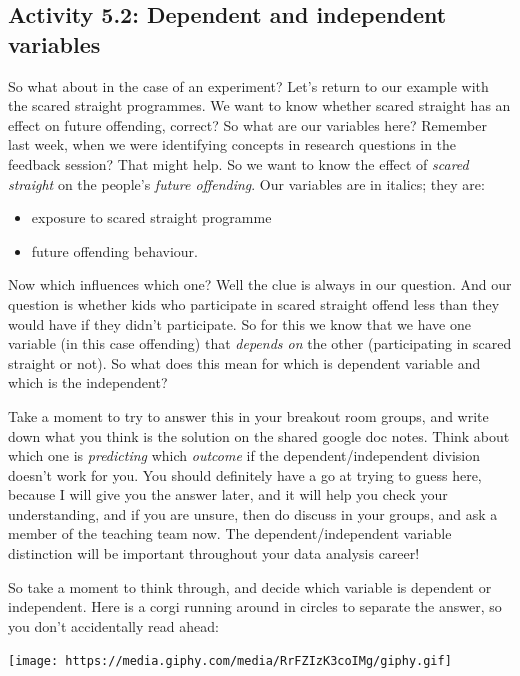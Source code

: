\documentclass[
]{book}
\providecommand{\tightlist}{%
  \setlength{\itemsep}{0pt}\setlength{\parskip}{0pt}}
\begin{document}
\hypertarget{activity-5.2-dependent-and-independent-variables}{%
\subsection{Activity 5.2: Dependent and independent variables}\label{activity-5.2-dependent-and-independent-variables}}

So what about in the case of an experiment? Let's return to our example with the scared straight programmes. We want to know whether scared straight has an effect on future offending, correct? So what are our variables here? Remember last week, when we were identifying concepts in research questions in the feedback session? That might help. So we want to know the effect of \emph{scared straight} on the people's \emph{future offending}. Our variables are in italics; they are:

\begin{itemize}
\tightlist
\item
  exposure to scared straight programme
\item
  future offending behaviour.
\end{itemize}

Now which influences which one? Well the clue is always in our question. And our question is whether kids who participate in scared straight offend less than they would have if they didn't participate. So for this we know that we have one variable (in this case offending) that \emph{depends on} the other (participating in scared straight or not). So what does this mean for which is dependent variable and which is the independent?

Take a moment to try to answer this in your breakout room groups, and write down what you think is the solution on the shared google doc notes. Think about which one is \emph{predicting} which \emph{outcome} if the dependent/independent division doesn't work for you. You should definitely have a go at trying to guess here, because I will give you the answer later, and it will help you check your understanding, and if you are unsure, then do discuss in your groups, and ask a member of the teaching team now. The dependent/independent variable distinction will be important throughout your data analysis career!

So take a moment to think through, and decide which variable is dependent or independent. Here is a corgi running around in circles to separate the answer, so you don't accidentally read ahead:

\texttt{[image: https://media.giphy.com/media/RrFZIzK3coIMg/giphy.gif]}
\end{document}
